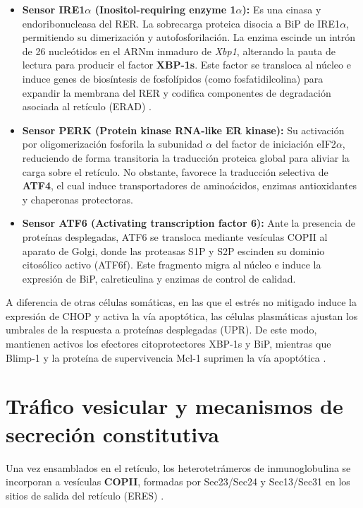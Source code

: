\begin{itemize}
	\item \textbf{Sensor IRE1$\alpha$ (Inositol-requiring enzyme 1$\alpha$):} Es una cinasa y endoribonucleasa del RER. La sobrecarga proteica disocia a BiP de IRE1$\alpha$, permitiendo su dimerización y autofosforilación. La enzima escinde un intrón de 26 nucleótidos en el ARNm inmaduro de \emph{Xbp1}, alterando la pauta de lectura para producir el factor \textbf{XBP-1s}. Este factor se transloca al núcleo e induce genes de biosíntesis de fosfolípidos (como fosfatidilcolina) para expandir la membrana del RER y codifica componentes de degradación asociada al retículo (ERAD) \parencite{todd2009xbp1}.
	\item \textbf{Sensor PERK (Protein kinase RNA-like ER kinase):} Su activación por oligomerización fosforila la subunidad $\alpha$ del factor de iniciación eIF2$\alpha$, reduciendo de forma transitoria la traducción proteica global para aliviar la carga sobre el retículo. No obstante, favorece la traducción selectiva de \textbf{ATF4}, el cual induce transportadores de aminoácidos, enzimas antioxidantes y chaperonas protectoras.
	\item \textbf{Sensor ATF6 (Activating transcription factor 6):} Ante la presencia de proteínas desplegadas, ATF6 se transloca mediante vesículas COPII al aparato de Golgi, donde las proteasas S1P y S2P escinden su dominio citosólico activo (ATF6f). Este fragmento migra al núcleo e induce la expresión de BiP, calreticulina y enzimas de control de calidad.
\end{itemize}


A diferencia de otras células somáticas, en las que el estrés no mitigado induce la expresión de CHOP y activa la vía apoptótica, las células plasmáticas ajustan los umbrales de la respuesta a proteínas desplegadas (UPR). De este modo, mantienen activos los efectores citoprotectores XBP-1s y BiP, mientras que Blimp-1 y la proteína de supervivencia Mcl-1 suprimen la vía apoptótica \parencite{walter2011unfolded}.


\section{Tráfico vesicular y mecanismos de secreción constitutiva}


Una vez ensamblados en el retículo, los heterotetrámeros de inmunoglobulina se incorporan a vesículas \textbf{COPII}, formadas por Sec23/Sec24 y Sec13/Sec31 en los sitios de salida del retículo (ERES) \parencite{karp2020cell,alberts2022molecular}.


